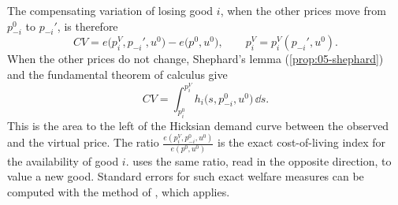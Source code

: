 The compensating variation of losing good $i$, when the other prices move from $p_{-i}^0$ to $p_{-i}'$, is
therefore
\begin{equation}\label{eq:05-cv-removal}
  CV = e\bigl(p_i^V, p_{-i}', u^0\bigr) - e\bigl(p^0, u^0\bigr), \qquad p_i^V = p_i^V(p_{-i}', u^0).
\end{equation}
When the other prices do not change, Shephard's lemma (\cref{prop:05-shephard}) and the fundamental theorem of
calculus give
\begin{equation}\label{eq:05-cv-removal-area}
  CV = \int_{p_i^0}^{p_i^V} h_i\bigl(s, p_{-i}^0, u^0\bigr)\,\dd s.
\end{equation}
This is the area to the left of the Hicksian demand curve between the observed and the virtual price. The ratio
$\frac{e(p_i^V,p_{-i}^0,u^0)}{e(p^0,u^0)}$ is the exact cost-of-living index for the availability of good
$i$. \citet[p.~212]{Hausman1997} uses the same ratio, read in the opposite direction, to value a new good. Standard
errors for such exact welfare measures can be computed with the method of \citet{HausmanNewey1995}, which
\citet[fn.~24]{Hausman1997} applies.

